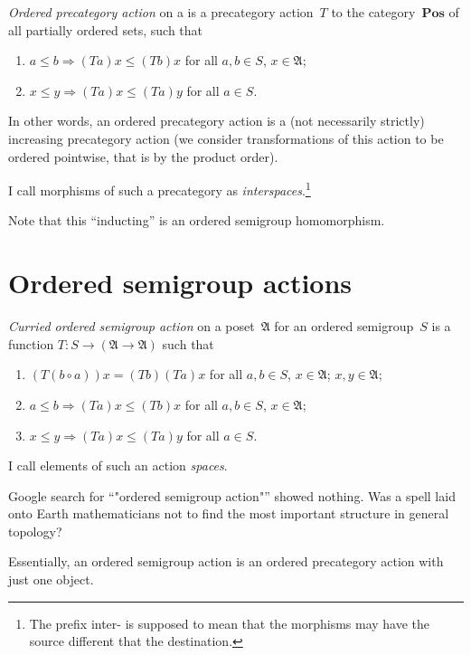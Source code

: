 \begin{defn}
\emph{Ordered precategory action} on a is a precategory action~$T$ to the category~$\mathbf{Pos}$ of all partially ordered sets, such that
\begin{enumerate}
\item $a\leq b\Rightarrow(Ta)x\leq (Tb)x$ for all $a,b\in S$, $x\in\mathfrak{A}$;
\item $x\leq y\Rightarrow(Ta)x\leq (Ta)y$ for all $a\in S$.
\end{enumerate}
In other words, an ordered precategory action is a (not necessarily strictly) increasing precategory action (we consider transformations of this action to be ordered pointwise, that is by the product order).

I call morphisms of such a precategory as \emph{interspaces}.\footnote{The prefix inter- is supposed to mean that the morphisms may have the source different that the destination.}
\end{defn}

Note that this ``inducting'' is an ordered semigroup homomorphism.

\chapter{Ordered semigroup actions}

\begin{defn}
\emph{Curried ordered semigroup action} on a poset~$\mathfrak{A}$ for an ordered semigroup~$S$ is a function $T:S\to(\mathfrak{A}\to\mathfrak{A})$ such that
\begin{enumerate}
\item $(T(b\circ a))x = (Tb)(Ta)x$ for all $a,b\in S$, $x\in\mathfrak{A}$;
$x,y\in\mathfrak{A}$;
\item $a\leq b\Rightarrow(Ta)x\leq (Tb)x$ for all $a,b\in S$, $x\in\mathfrak{A}$;
\item $x\leq y\Rightarrow(Ta)x\leq (Ta)y$ for all $a\in S$.
\end{enumerate}
I call elements of such an action \emph{spaces}.
\end{defn}

\begin{rem}
Google search for ``"ordered semigroup action"'' showed nothing. Was a spell laid onto Earth mathematicians not to find the most important structure in general topology?
\end{rem}

Essentially, an ordered semigroup action is an ordered precategory action with just one object.

